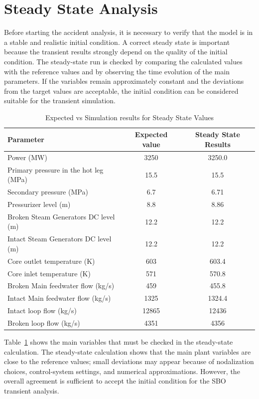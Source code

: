 \documentclass[a4paper,11pt]{article}
\numberwithin{subsubsection}{subsection}
\numberwithin{subsection}{section}
\newcommand{\tabref}[1]{Table~\ref{#1}}
\begin{document}
\section{Steady State Analysis}
Before starting the accident analysis, it is necessary to verify that the model is in a stable and realistic initial condition.  
A correct steady state is important because the transient results strongly depend on the quality of the initial condition.
The steady-state run is checked by comparing the calculated values with the reference values and by observing the time evolution of the main parameters.  
If the variables remain approximately constant and the deviations from the target values are acceptable, the initial condition can be considered suitable for the transient simulation.
 

                                     

\begin{table}[h]
\centering
\begin{tabular}{lcc}
\toprule
Parameter & Expected value & Steady State Results\\
\midrule
Power (MW) & 3250 & 3250.0\\
Primary pressure in the hot leg (MPa) & 15.5 & 15.5\\
Secondary pressure (MPa) & 6.7 & 6.71\\
Pressurizer level (m) & 8.8 & 8.86\\
Broken Steam Generators DC level (m) & 12.2 & 12.2\\
Intact Steam Generators DC level (m) & 12.2 & 12.2\\
Core outlet temperature (K) & 603 & 603.4\\
Core inlet temperature (K) & 571 & 570.8\\
Broken Main feedwater flow (kg/s) & 459 & 455.8\\
Intact Main feedwater flow (kg/s) & 1325 & 1324.4\\
Intact loop flow (kg/s) & 12865 & 12436\\
Broken loop flow (kg/s) & 4351 & 4356\\
\bottomrule
\end{tabular}
\caption{Expected vs Simulation results for Steady State Values}
\label{tab:Targetvalues}
\end{table}

\tabref{tab:Targetvalues} shows the main variables that must be checked in the steady-state calculation. The steady-state calculation shows that the main plant variables are close to the reference values; small deviations may appear because of nodalization choices, control-system settings, and numerical approximations.  
However, the overall agreement is sufficient to accept the initial condition for the SBO transient analysis.
\end{document}
